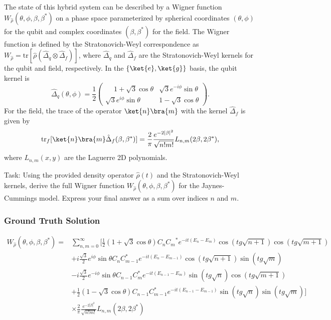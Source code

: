 \documentclass[10pt]{article}
\begin{document}
The state of this hybrid system can be described by a Wigner function $W_{\hat{\rho}}(\theta, \phi, \beta, \beta^*)$ on a phase space parameterized by spherical coordinates $(\theta, \phi)$ for the qubit and complex coordinates $(\beta, \beta^*)$ for the field. The Wigner function is defined by the Stratonovich-Weyl correspondence as $W_{\hat{\rho}} = \mathrm{tr}[\hat{\rho} (\hat{\Delta}_q \otimes \hat{\Delta}_f)]$, where $\hat{\Delta}_q$ and $\hat{\Delta}_f$ are the Stratonovich-Weyl kernels for the qubit and field, respectively. In the $\{\ket{e}, \ket{g}\}$ basis, the qubit kernel is
$$
\hat{\Delta}_q(\theta,\phi) = \frac{1}{2}\left(
\begin{array}{cc}
\phantom{+}1+\sqrt{3}\cos{\theta} & \sqrt{3}e^{-i\phi}\sin{\theta} \\
\sqrt{3}e^{i\phi}\sin{\theta} & 1-\sqrt{3}\cos{\theta} 
\end{array}
\right).
$$
For the field, the trace of the operator $\ket{n}\bra{m}$ with the kernel $\hat{\Delta}_f$ is given by
$$
\mathrm{tr}_f[\ket{n}\bra{m} \hat{\Delta}_f(\beta, \beta^*)] = \frac{2}{\pi}\frac{e^{-2\left|\beta\right|^{2}}}{\sqrt{n!m!}}L_{n,m}(2\beta,2\beta^{*}),
$$
where $L_{n,m}(x, y)$ are the Laguerre 2D polynomials.

Task:
Using the provided density operator $\hat{\rho}(t)$ and the Stratonovich-Weyl kernels, derive the full Wigner function $W_{\hat{\rho}}(\theta, \phi, \beta, \beta^*)$ for the Jaynes-Cummings model. Express your final answer as a sum over indices $n$ and $m$.

\subsubsection*{Ground Truth Solution}
\[ \boxed{\begin{aligned}
W_{\hat{\rho}}(\theta, \phi, \beta,\beta^{*}) = & \sum_{n,m=0}^{\infty}\Big[\frac{1}{2}(1+\sqrt{3}\cos\theta) C_n{C_m}^{*} {e^{-it(E_n-E_m)}}\cos(tg\sqrt{n+1})\cos(tg\sqrt{m+1}) \\
& +i\frac{\sqrt{3}}{2}e^{i\phi}\sin\theta C_n C_{m-1}^{*}{e^{-it(E_n-E_{m-1})}}\cos(tg\sqrt{n+1})\sin(tg\sqrt{m}) \\
& -i\frac{\sqrt{3}}{2}e^{-i\phi}\sin\theta C_{n-1}C_m^{*} {e^{-it(E_{n-1}-E_m)}}\sin(tg\sqrt{n})\cos(tg\sqrt{m+1}) \\
& +\frac{1}{2}(1-\sqrt{3}\cos\theta) C_{n-1}C_{m-1}^{*} {e^{-it(E_{n-1}-E_{m-1})}}\sin(tg\sqrt{n})\sin(tg\sqrt{m})\Big] \\
& \times \frac{2}{\pi}\frac{e^{-2|\beta|^{2}}}{\sqrt{n!m!}}L_{n,m}(2\beta,2\beta^{*})
\end{aligned}} \]
\end{document}
